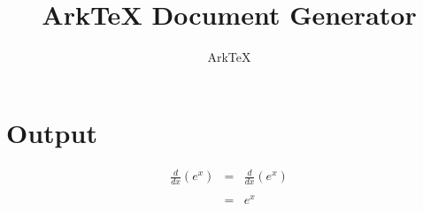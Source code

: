\documentclass[dvips, 12pt, twoside]{article}
\begin{document}
\title{ArkTeX Document Generator}
\author{ArkTeX}
\maketitle

\medskip

\section*{Output}
\begin{Large}
\begin{eqnarray*}
\frac{d}{dx}(e^{x})&=&\frac{d}{dx}(e^{x})\\
\\
&=&e^{x}\\
\\
\end{eqnarray*}
\end{Large}
\end{document}
